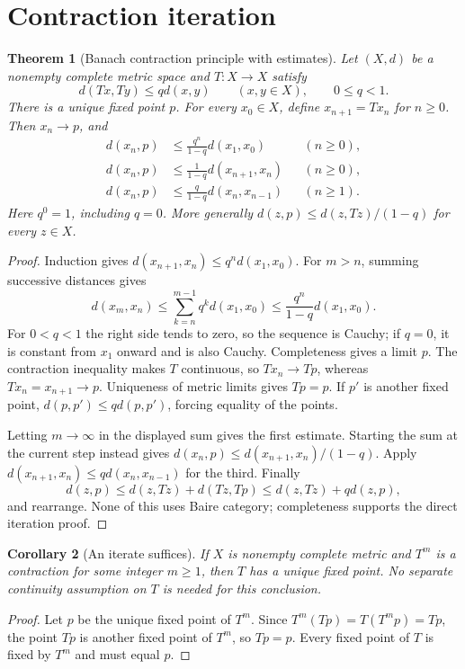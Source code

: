 \documentclass[11pt,oneside,openany]{book}
\newtheorem{theorem}{Theorem}[chapter]
\newtheorem{corollary}[theorem]{Corollary}
\theoremstyle{definition}
\theoremstyle{remark}
\begin{document}
\section{Contraction iteration}

\begin{theorem}[Banach contraction principle with estimates]\label{d10:14:banach}
Let $(X,d)$ be a nonempty complete metric space and $T:X\to X$ satisfy
\[
 d(Tx,Ty)\leq qd(x,y)\qquad(x,y\in X),\qquad 0\leq q<1.
\]
There is a unique fixed point $p$. For every $x_0\in X$, define $x_{n+1}=Tx_n$ for $n\geq0$. Then $x_n\to p$, and
\begin{align*}
 d(x_n,p)&\leq\frac{q^n}{1-q}d(x_1,x_0) &&(n\geq0),\\
 d(x_n,p)&\leq\frac{1}{1-q}d(x_{n+1},x_n) &&(n\geq0),\\
 d(x_n,p)&\leq\frac{q}{1-q}d(x_n,x_{n-1}) &&(n\geq1).
\end{align*}
Here $q^0=1$, including $q=0$. More generally $d(z,p)\leq d(z,Tz)/(1-q)$ for every $z\in X$.
\end{theorem}
\begin{proof}
Induction gives $d(x_{n+1},x_n)\leq q^nd(x_1,x_0)$. For $m>n$, summing successive distances gives
\[
 d(x_m,x_n)\leq\sum_{k=n}^{m-1}q^kd(x_1,x_0)
 \leq\frac{q^n}{1-q}d(x_1,x_0).
\]
For $0<q<1$ the right side tends to zero, so the sequence is Cauchy; if $q=0$, it is constant from $x_1$ onward and is also Cauchy. Completeness gives a limit $p$. The contraction inequality makes $T$ continuous, so $Tx_n\to Tp$, whereas $Tx_n=x_{n+1}\to p$. Uniqueness of metric limits gives $Tp=p$. If $p'$ is another fixed point, $d(p,p')\leq qd(p,p')$, forcing equality of the points.

Letting $m\to\infty$ in the displayed sum gives the first estimate. Starting the sum at the current step instead gives $d(x_n,p)\leq d(x_{n+1},x_n)/(1-q)$. Apply $d(x_{n+1},x_n)\leq qd(x_n,x_{n-1})$ for the third. Finally
\[
 d(z,p)\leq d(z,Tz)+d(Tz,Tp)\leq d(z,Tz)+qd(z,p),
\]
and rearrange. None of this uses Baire category; completeness supports the direct iteration proof.
\end{proof}

\begin{corollary}[An iterate suffices]\label{d10:14:iterate-contraction}
If $X$ is nonempty complete metric and $T^m$ is a contraction for some integer $m\geq1$, then $T$ has a unique fixed point. No separate continuity assumption on $T$ is needed for this conclusion.
\end{corollary}
\begin{proof}
Let $p$ be the unique fixed point of $T^m$. Since $T^m(Tp)=T(T^mp)=Tp$, the point $Tp$ is another fixed point of $T^m$, so $Tp=p$. Every fixed point of $T$ is fixed by $T^m$ and must equal $p$.
\end{proof}
\end{document}
